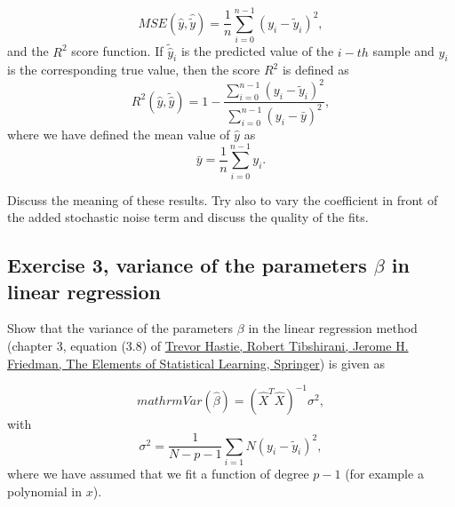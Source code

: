 \documentclass[%
oneside,                 %
final,                   %
10pt]{article}
\begin{document}
\noindent
\[ MSE(\hat{y},\hat{\tilde{y}}) = \frac{1}{n}
\sum_{i=0}^{n-1}(y_i-\tilde{y}_i)^2, 
\] 
and the $R^2$ score function.
If $\tilde{\hat{y}}_i$ is the predicted value of the $i-th$ sample and $y_i$ is the corresponding true value, then the score $R^2$ is defined as
\[
R^2(\hat{y}, \tilde{\hat{y}}) = 1 - \frac{\sum_{i=0}^{n - 1} (y_i - \tilde{y}_i)^2}{\sum_{i=0}^{n - 1} (y_i - \bar{y})^2},
\]
where we have defined the mean value  of $\hat{y}$ as
\[
\bar{y} =  \frac{1}{n} \sum_{i=0}^{n - 1} y_i.
\]

Discuss the meaning of these results. Try also to vary the coefficient in front of the added stochastic noise term and discuss the quality of the fits.




\subsection{Exercise 3, variance of the parameters $\beta$ in linear regression}

Show that the variance of the parameters $\beta$ in the linear regression method (chapter 3, equation (3.8) of \href{{https://www.springer.com/gp/book/9780387848570}}{Trevor Hastie, Robert Tibshirani, Jerome H. Friedman, The Elements of Statistical Learning, Springer}) is given as 

\[
mathrm{Var}(\hat{\beta}) = \left(\hat{X}^T\hat{X}\right)^{-1}\sigma^2,
\]
with 
\[
\sigma^2 = \frac{1}{N-p-1}\sum_{i=1}{N} (y_i-\tilde{y}_i)^2,
\]
where we have assumed that we fit a function of degree $p-1$ (for example a polynomial in $x$). 



\end{document}
